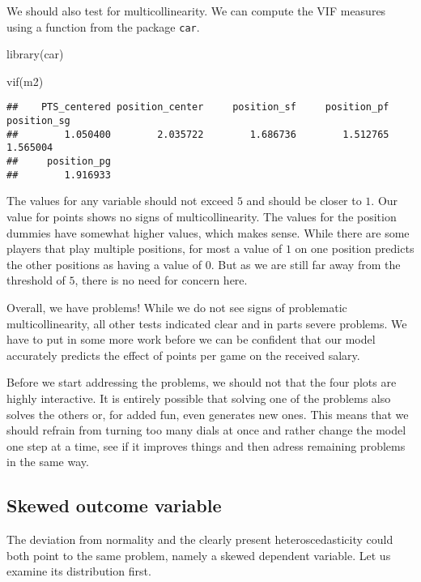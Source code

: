 \documentclass[
]{book}
\newenvironment{Shaded}{\begin{snugshade}}{\end{snugshade}}
\newcommand{\FunctionTok}[1]{\textcolor[rgb]{0.00,0.00,0.00}{#1}}
\newcommand{\NormalTok}[1]{#1}
\begin{document}
We should also test for multicollinearity. We can compute the VIF measures using
a function from the package \texttt{car}.

\begin{Shaded}
\begin{Highlighting}[]
\FunctionTok{library}\NormalTok{(car)}

\FunctionTok{vif}\NormalTok{(m2)}
\end{Highlighting}
\end{Shaded}

\begin{verbatim}
##    PTS_centered position_center     position_sf     position_pf     position_sg 
##        1.050400        2.035722        1.686736        1.512765        1.565004 
##     position_pg 
##        1.916933
\end{verbatim}

The values for any variable should not exceed \(5\) and should be closer to \(1\).
Our value for points shows no signs of multicollinearity. The values for the
position dummies have somewhat higher values, which makes sense. While there are
some players that play multiple positions, for most a value of \(1\) on one
position predicts the other positions as having a value of \(0\). But as we are
still far away from the threshold of \(5\), there is no need for concern here.

Overall, we have problems! While we do not see signs of problematic
multicollinearity, all other tests indicated clear and in parts severe problems.
We have to put in some more work before we can be confident that our model
accurately predicts the effect of points per game on the received salary.

Before we start addressing the problems, we should not that the four plots are
highly interactive. It is entirely possible that solving one of the problems
also solves the others or, for added fun, even generates new ones. This means
that we should refrain from turning too many dials at once and rather change the
model one step at a time, see if it improves things and then adress remaining
problems in the same way.

\hypertarget{skewed-outcome-variable}{%
\subsection{Skewed outcome variable}\label{skewed-outcome-variable}}

The deviation from normality and the clearly present heteroscedasticity could
both point to the same problem, namely a skewed dependent variable. Let us
examine its distribution first.
\end{document}
